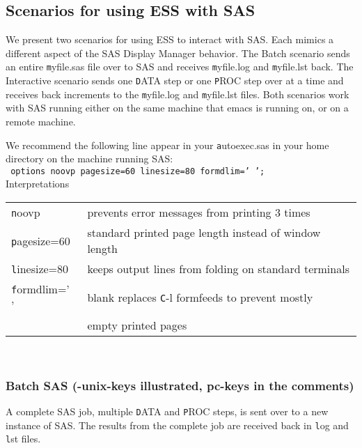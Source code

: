 \documentclass{article}
\newcommand{\elcode}[1]{\\{\texttt{\hspace*{2em} #1}}\\}
\begin{document}
\subsection{Scenarios for using ESS with SAS}
\label{sec:SAS:scen}

We present two scenarios for using ESS to interact with SAS.  Each
mimics a different aspect of the SAS Display Manager behavior.  The
Batch scenario sends an entire {\texttt myfile.sas} file over to SAS
and receives {\texttt myfile.log} and {\texttt myfile.lst} back.  The
Interactive scenario sends one {\texttt DATA} step or one {\texttt
  PROC} step over at a time and receives back increments to the
{\texttt myfile.log} and {\texttt myfile.lst} files.  Both scenarios
work with SAS running either on the same machine that emacs is running
on, or on a remote machine.

We recommend the following line appear in your {\texttt autoexec.sas}
in your home directory on the machine running SAS: 
\elcode{options noovp pagesize=60 linesize=80 formdlim=' ';}
Interpretations\\
\begin{tabular}{ll}
\texttt   noovp         & prevents error messages from printing 3
                          times         \\ 
\texttt   pagesize=60   & standard printed page length instead of
                          window length \\ 
\texttt   linesize=80   & keeps output lines from folding on standard
                          terminals \\ 
\texttt   formdlim=' '  & blank replaces {\texttt C-l} formfeeds to
                          prevent mostly  \\ 
\texttt                 & empty printed pages                     \\
\end{tabular}\\

\subsubsection{Batch SAS (-unix-keys illustrated, pc-keys in the comments)}
\label{sec:SAS:batch}
A complete SAS job, multiple {\texttt DATA} and {\texttt PROC} steps,
is sent over to a new instance of SAS.  The results from the complete
job are received back in {\texttt log} and {\texttt lst} files.
\end{document}
